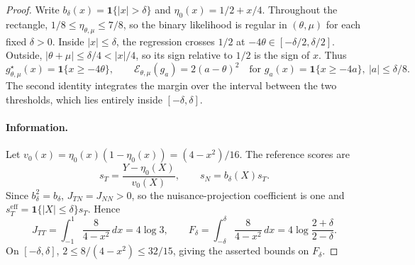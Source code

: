 \begin{proof}
Write $b_\delta(x)=\mathbf1\{|x|>\delta\}$ and $\eta_0(x)=1/2+x/4$. Throughout the rectangle, $1/8\le\eta_{\theta,\mu}\le7/8$, so the binary likelihood is regular in $(\theta,\mu)$ for each fixed $\delta>0$. Inside $|x|\le\delta$, the regression crosses $1/2$ at $-4\theta\in[-\delta/2,\delta/2]$. Outside, $|\theta+\mu|\le\delta/4<|x|/4$, so its sign relative to $1/2$ is the sign of $x$. Thus
\begin{equation}
g_{\theta,\mu}^\star(x)=\mathbf1\{x\ge-4\theta\},
\qquad
\mathcal E_{\theta,\mu}(g_a)=2(a-\theta)^2
\quad\text{for }g_a(x)=\mathbf1\{x\ge-4a\},\ |a|\le\delta/8.
\label{eq:boundary-region-risk-identity}
\end{equation}
The second identity integrates the margin over the interval between the two thresholds, which lies entirely inside $[-\delta,\delta]$.

\paragraph{Information.}
Let $v_0(x)=\eta_0(x)(1-\eta_0(x))=(4-x^2)/16$. The reference scores are
\[
s_T=\frac{Y-\eta_0(X)}{v_0(X)},\qquad s_N=b_\delta(X)s_T.
\]
Since $b_\delta^2=b_\delta$, $J_{TN}=J_{NN}>0$, so the nuisance-projection coefficient is one and $s_T^{\mathrm{eff}}=\mathbf1\{|X|\le\delta\}s_T$. Hence
\begin{equation}
J_{TT}=\int_{-1}^{1}\frac8{4-x^2}\,dx=4\log3,
\qquad
F_\delta=\int_{-\delta}^{\delta}\frac8{4-x^2}\,dx
=4\log\frac{2+\delta}{2-\delta}.
\label{eq:boundary-region-information-integrals}
\end{equation}
On $[-\delta,\delta]$, $2\le8/(4-x^2)\le32/15$, giving the asserted bounds on $F_\delta$.


\end{proof}
